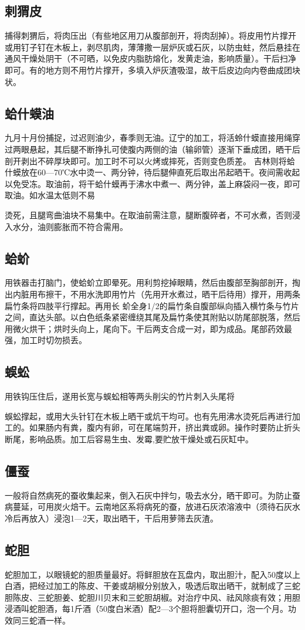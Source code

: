 \documentclass{ctexbook}
\begin{document}
\subsection{剌猬皮}
捕得刺猬后，将肉压出（有些地区用刀从腹部剖开，将肉刮掉）。将皮用竹片撑开或用钉子钉在木板上，剥尽肌肉，薄薄撒一层炉灰或石灰，以防虫蛀，然后悬挂在通风干燥处阴干（不可晒，以免皮内脂肪熔化，发黄走油，影响质量）。干后扫净即可。有的地方则不用竹片撑开，多填入炉灰渣吸湿，故干后皮边向内卷曲成团块状。
\subsection{蛤什蟆油}
九月十月份捕捉，过迟则油少，春季则无油。辽宁的加工，将活蛉什蟆直接用绳穿过两眼悬起，其后腿不断挣扎可使腹内两侧的油（输卵管）逐渐下垂成团，晒干后剖开剥出不碎厚块即可。加工时不可以火烤或摔死，否则变色质差。
吉林则将蛤什蟆放在60—70℃水中烫一、两分钟，待后腿伸直死后取出吊起晒干。夜间需收起以免受冻。取油前，将干蛤什蟆再于沸水中煮一、两分钟，盖上麻袋闷一夜，即可取油。如水温太低则不易

烫死，且腿弯曲油块不易集中。在取油前需注意，腿断腹碎者，不可水煮，否则浸入水分，油则膨胀而不符合需用。
\subsection{蛤蚧}
用铁器击打脑门，使蛤蚧立即晕死。用利剪挖掉眼睛，然后由腹部至胸部剖开，掏出内脏用布擦干，不用水洗即用竹片（先用开水煮过，晒干后待用）撑开，用两条扁竹条将四肢平行撑起。再用长
蚧全身1/2的扁竹条自腹部纵向插入横竹条与竹片之间，直达头部。以白色纸条紧密缠绕其尾及扁竹条使其附贴以防尾部脱落，然后用微火烘干；烘时头向上，尾向下。干后两支合成一对，即为成品。尾部药效最强，加工时切勿损丢。
\subsection{蜈蚣}
用铁钩压住后，遂用长宽与蜈蚣相等两头削尖的竹片刺入头尾将

蜈蚣撑起，或用大头针钉在木板上晒干或炕干均可。也有先用沸水烫死后再进行加工的。如果肠内有粪，腹内有卵，可在尾端剪开，挤出粪或卵。操作时要防止折头断尾，影响品质。加工后容易生虫、发霉,要贮放干燥处或石灰缸中。
\subsection{僵蚕}
一般将自然病死的蚕收集起来，倒入石灰中拌匀，吸去水分，晒干即可。为防止蚕病蔓延，可用炭火焙干。云南地区系将病死的蚕，放进石灰浓溶液中（须待石灰水冷后再放入）浸泡1—2天，取出晒干，干后用萝筛去灰渣。
\subsection{蛇胆}
蛇胆加工，以眼镜蛇的胆质量最好。将鲜胆放在瓦盘内，取出胆汁，配入50度以上白酒，把经过加工的陈皮、干姜或胡椒分别放入，吸透后取出晒干，就制成了三蛇胆陈皮、三蛇胆姜、蛇胆川贝末和三蛇胆胡椒。对治疗中风、祛风除痰有效；用胆浸酒叫蛇胆酒，每1斤酒（50度白米酒）配2—3个胆将胆囊切开口，泡一个月。功效同三蛇酒一样。
\end{document}
